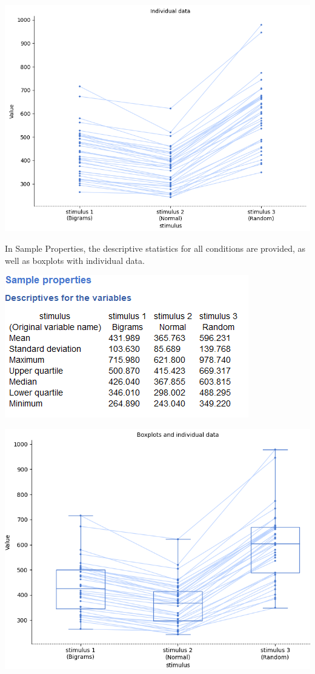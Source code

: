 \documentclass[
]{book}
\begin{document}
\includegraphics{img/ch9/9.4CRMVAG_raw.png}

In Sample Properties, the descriptive statistics for all conditions are provided, as well as boxplots with individual data.

\includegraphics{img/ch9/9.4CRMVAG_sampleproperties.png}

\includegraphics{img/ch9/9.4CRMVAG_boxplot.png}
\end{document}

